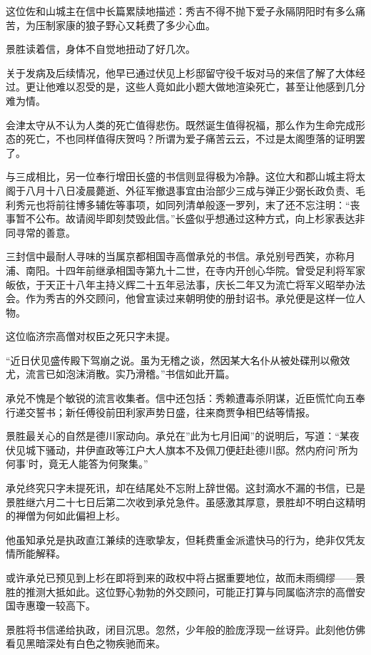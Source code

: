 \documentclass[
]{book}
\begin{document}
这位佐和山城主在信中长篇累牍地描述：秀吉不得不抛下爱子永隔阴阳时有多么痛苦，为压制家康的狼子野心又耗费了多少心血。

景胜读着信，身体不自觉地扭动了好几次。

关于发病及后续情况，他早已通过伏见上杉邸留守役千坂对马的来信了解了大体经过。更让他难以忍受的是，这些人竟如此小题大做地渲染死亡，甚至让他感到几分难为情。

会津太守从不认为人类的死亡值得悲伤。既然诞生值得祝福，那么作为生命完成形态的死亡，不也同样值得庆贺吗？所谓为爱子痛苦云云，不过是太阁堕落的证明罢了。

与三成相比，另一位奉行增田长盛的书信则显得极为冷静。这位大和郡山城主将太阁于八月十八日凌晨薨逝、外征军撤退事宜由治部少三成与弹正少弼长政负责、毛利秀元也将前往博多辅佐等事项，如同列清单般逐一罗列，末了还不忘注明：``丧事暂不公布。故请阅毕即刻焚毁此信。''长盛似乎想通过这种方式，向上杉家表达非同寻常的善意。

三封信中最耐人寻味的当属京都相国寺高僧承兑的书信。承兑别号西笑，亦称月浦、南阳。十四年前继承相国寺第九十二世，在寺内开创心华院。曾受足利将军家皈依，于天正十八年主持义辉二十五年忌法事，庆长二年又为流亡将军义昭举办法会。作为秀吉的外交顾问，他曾宣读过来朝明使的册封诏书。承兑便是这样一位人物。

这位临济宗高僧对权臣之死只字未提。

``近日伏见盛传殿下驾崩之说。虽为无稽之谈，然因某大名仆从被处碟刑以儆效尤，流言已如泡沫消散。实乃滑稽。''书信如此开篇。

承兑不愧是个敏锐的流言收集者。信中还包括：秀赖遭毒杀阴谋，近臣慌忙向五奉行递交誓书；新任傅役前田利家声势日盛，往来商贾争相巴结等情报。

景胜最关心的自然是德川家动向。承兑在''此为七月旧闻''的说明后，写道：``某夜伏见城下骚动，井伊直政等江户大人旗本不及佩刀便赶赴德川邸。然内府问'所为何事'时，竟无人能答为何聚集。''

承兑终究只字未提死讯，却在结尾处不忘附上辞世偈。这封滴水不漏的书信，已是景胜继六月二十七日后第二次收到承兑急件。虽感激其厚意，景胜却不明白这精明的禅僧为何如此偏袒上杉。

他虽知承兑是执政直江兼续的连歌挚友，但耗费重金派遣快马的行为，绝非仅凭友情所能解释。

或许承兑已预见到上杉在即将到来的政权中将占据重要地位，故而未雨绸缪------景胜的推测大抵如此。这位野心勃勃的外交顾问，可能正打算与同属临济宗的高僧安国寺惠瓊一较高下。

景胜将书信递给执政，闭目沉思。忽然，少年般的脸庞浮现一丝讶异。此刻他仿佛看见黑暗深处有白色之物疾驰而来。
\end{document}

